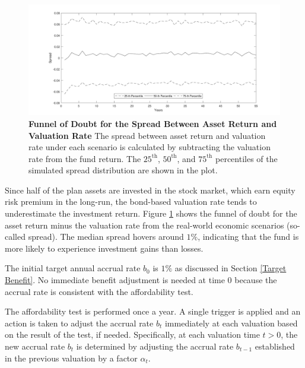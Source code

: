 \documentclass{sfuthesis}
\numberwithin{equation}{chapter}
\begin{document}
		\begin{figure}[h]
			\includegraphics[width=1\linewidth]{ResultPlot/Spread.pdf} 
			\caption[Funnel of Doubt for the Spread Between Asset Return and Valuation Rate]{\textbf{Funnel of Doubt for the Spread Between Asset Return and Valuation Rate}
				\vspace{-0.4cm}
				\newline\footnotesize\justify The spread between asset return and valuation rate under each scenario is calculated by subtracting the valuation rate from the fund return. The $25^{\text{th}}$, $50^{\text{th}}$, and $75^{\text{th}}$ percentiles of the simulated spread distribution are shown in the plot.}
			\label{fig:Funnel of Doubt for the Spread Between Asset Return and Valuation Rate}
		\end{figure}
		\vspace{-0.4cm}
		
		\justify
		Since half of the plan assets are invested in the stock market, which earn equity risk premium in the long-run, the bond-based valuation rate tends to underestimate the investment return. Figure \ref{fig:Funnel of Doubt for the Spread Between Asset Return and Valuation Rate} shows the funnel of doubt for the asset return minus the valuation rate from the real-world economic scenarios (so-called spread). The median spread hovers around $1\%$, indicating that the fund is more likely to experience investment gains than losses.
	
	
		\justify
		The initial target annual accrual rate $b_{0}$ is $1\%$ as discussed in Section \ref{Target Benefit}. No immediate benefit adjustment is needed at time $0$ because the accrual rate is consistent with the affordability test.
	
	
		\justify
		The affordability test is performed once a year. A single trigger is applied and an action is taken to adjust the accrual rate $b_{t}$ immediately at each valuation based on the result of the test, if needed. Specifically, at each valuation time $t>0$, the new accrual rate $b_{t}$ is determined by adjusting the accrual rate $b_{t-1}$ established in the previous valuation by a factor $\alpha_{t}$.
	
\end{document}
